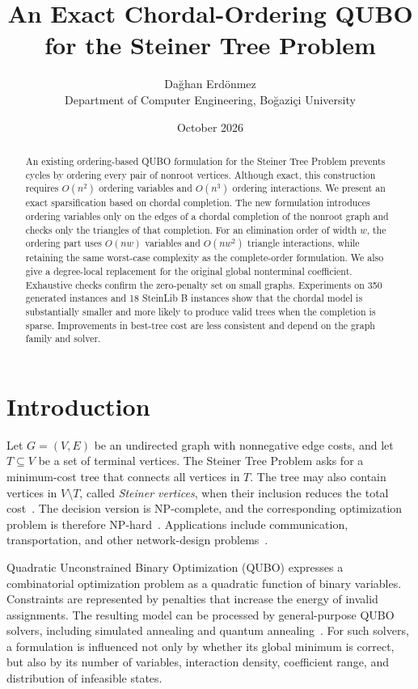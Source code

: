 \documentclass[10pt,a4paper]{article}
\title{\textbf{An Exact Chordal-Ordering QUBO\\for the Steiner Tree Problem}}
\author{Da\u{g}han Erd\"onmez\\
\small Department of Computer Engineering, Bo\u{g}azi\c{c}i University}
\date{October 2026}
\begin{document}
\maketitle

\begin{abstract}
An existing ordering-based QUBO formulation for the Steiner Tree Problem
prevents cycles by ordering every pair of nonroot vertices. Although exact,
this construction requires $O(n^2)$ ordering variables and $O(n^3)$ ordering
interactions. We present an exact sparsification based on chordal completion.
The new formulation introduces ordering variables only on the edges of a
chordal completion of the nonroot graph and checks only the triangles of that
completion. For an elimination order of width $w$, the ordering part uses
$O(nw)$ variables and $O(nw^2)$ triangle interactions, while retaining the
same worst-case complexity as the complete-order formulation. We also give a
degree-local replacement for the original global nonterminal coefficient.
Exhaustive checks confirm the zero-penalty set on small graphs. Experiments on
350 generated instances and 18 SteinLib B instances show that the chordal
model is substantially smaller and more likely to produce valid trees when
the completion is sparse. Improvements in best-tree cost are less consistent
and depend on the graph family and solver.
\end{abstract}

\section{Introduction}

Let $G=(V,E)$ be an undirected graph with nonnegative edge costs, and let
$T\subseteq V$ be a set of terminal vertices. The Steiner Tree Problem asks
for a minimum-cost tree that connects all vertices in $T$. The tree may also
contain vertices in $V\setminus T$, called \emph{Steiner vertices}, when their
inclusion reduces the total cost~\cite{hwang1992}. The decision version is
NP-complete, and the corresponding optimization problem is therefore
NP-hard~\cite{karp1972}. Applications include communication, transportation,
and other network-design problems~\cite{hwang1992}.

Quadratic Unconstrained Binary Optimization (QUBO) expresses a combinatorial
optimization problem as a quadratic function of binary variables. Constraints
are represented by penalties that increase the energy of invalid assignments.
The resulting model can be processed by general-purpose QUBO solvers,
including simulated annealing and quantum annealing~\cite{glover2019,lucas2014}.
For such solvers, a formulation is influenced not only by whether its global
minimum is correct, but also by its number of variables, interaction density,
coefficient range, and distribution of infeasible states.
\end{document}
